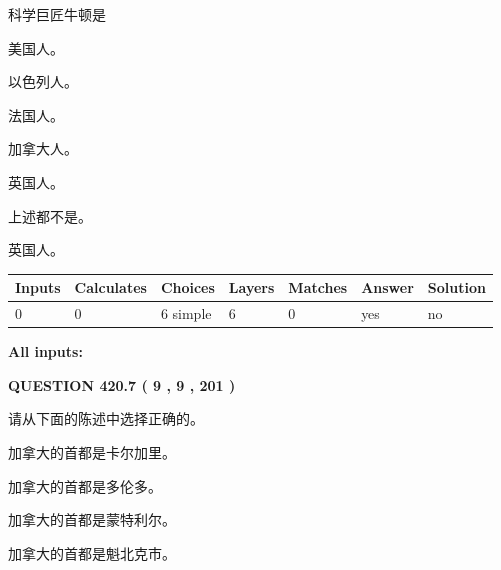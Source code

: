 \documentclass{ctexart}
\begin{document}
  
科学巨匠牛顿是
 
 
美国人。
 
 
以色列人。
 
 
法国人。
 
 
加拿大人。
 
 
英国人。
 
 
 上述都不是。
 
 
\noindent{}
 
 
英国人。
 
 
\noindent{}
 
 
   
   
   
   
\noindent\begin{tabular}{|l|l|l|l|l|l|l|}
 \hline
Inputs & Calculates & Choices & Layers & Matches & Answer & Solution \\ \hline
 0  & 
 0  & 
 6
  simple  
  & 
 6  & 
 0  & 
  yes & 
  no 
  \\ \hline
 \end{tabular}
   
   
   
   
\noindent{}
   
   
   
   
\noindent\vspace{0.1in}\hspace{-0.08in} {\textbf{\Large{All inputs: }}}
   
   
  
\vspace{0.2in}
  
{\textbf{\Large{QUESTION
420.7 
 ( 9 , 9 , 201 )
}}}
  
  
请从下面的陈述中选择正确的。
 
 
加拿大的首都是卡尔加里。
 
 
加拿大的首都是多伦多。
 
 
加拿大的首都是蒙特利尔。
 
 
加拿大的首都是魁北克市。
 
\end{document}
